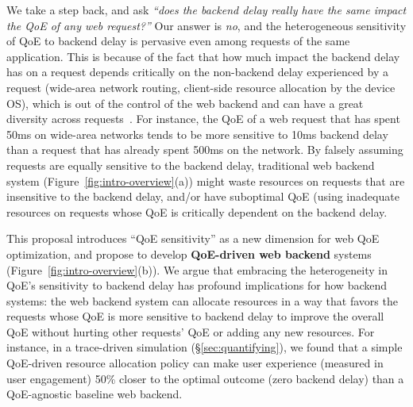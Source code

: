 We take a step back, and ask {\em ``does the backend delay really have the same impact the QoE of any web request?''}
Our answer is {\em no}, and the heterogeneous sensitivity of QoE to backend delay is pervasive even among requests of the same application. 
This is because of the fact that how much impact the backend delay has on a request depends critically on the non-backend delay experienced by a request (\eg wide-area network routing, client-side resource allocation by the device OS), which is out of the control of the web backend and can have a great diversity across requests~\cite{timecard,dqbarge}.
For instance, the QoE of a web request that has spent 50ms on wide-area networks tends to be more sensitive to 10ms backend delay than a request that has already spent 500ms on the network. 
By falsely assuming requests are equally sensitive to the backend delay, traditional web backend system (Figure~\ref{fig:intro-overview}(a)) might waste resources on requests that are insensitive to the backend delay, and/or have suboptimal QoE (\eg using inadequate resources on requests whose QoE is critically dependent on the backend delay. 

This proposal introduces ``QoE sensitivity'' as a new dimension for web QoE optimization, and propose to develop {\bf QoE-driven web backend} systems (Figure~\ref{fig:intro-overview}(b)). 
We argue that embracing the heterogeneity in QoE's sensitivity to backend delay has profound implications for how backend systems: 
the web backend system can allocate resources in a way that favors the requests whose QoE is more sensitive to backend delay to improve the overall QoE without hurting other requests' QoE or adding any new resources.
For instance, in a trace-driven simulation (\S\ref{sec:quantifying}), we found that a simple QoE-driven resource allocation policy can make user experience (measured in user engagement) 50\% closer to the optimal outcome (\ie zero backend delay) than a QoE-agnostic baseline web backend.

